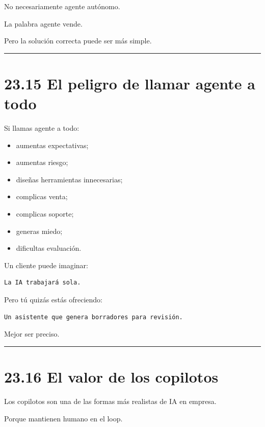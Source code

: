 No necesariamente agente autónomo.

La palabra agente vende.

Pero la solución correcta puede ser más simple.

\begin{center}\rule{0.5\linewidth}{0.5pt}\end{center}

\section{23.15 El peligro de llamar agente a
todo}\label{el-peligro-de-llamar-agente-a-todo}

Si llamas agente a todo:

\begin{itemize}
\tightlist
\item
  aumentas expectativas;
\item
  aumentas riesgo;
\item
  diseñas herramientas innecesarias;
\item
  complicas venta;
\item
  complicas soporte;
\item
  generas miedo;
\item
  dificultas evaluación.
\end{itemize}

Un cliente puede imaginar:

\begin{lstlisting}
La IA trabajará sola.
\end{lstlisting}

Pero tú quizás estás ofreciendo:

\begin{lstlisting}
Un asistente que genera borradores para revisión.
\end{lstlisting}

Mejor ser preciso.

\begin{center}\rule{0.5\linewidth}{0.5pt}\end{center}

\section{23.16 El valor de los
copilotos}\label{el-valor-de-los-copilotos}

Los copilotos son una de las formas más realistas de IA en empresa.

Porque mantienen humano en el loop.

